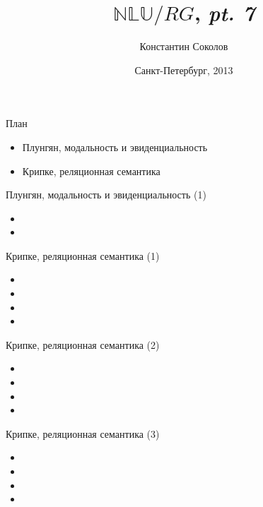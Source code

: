 \documentclass{beamer}
\begin{document}
\title{\huge{$\mathbb{NLU}/RG$, \textit{pt. 7}}}
\author{Константин Соколов}
\date{Санкт-Петербург, 2013} 
\begin{frame}
    \thispagestyle{empty}
    \titlepage
\end{frame}

\begin{frame}{План}
    \setcounter{framenumber}{1}
    \begin{itemize}
        \item Плунгян, модальность и эвиденциальность
        \item Крипке, реляционная семантика
    \end{itemize}
\end{frame}

\begin{frame}{Плунгян, модальность и эвиденциальность (1)}
\begin{itemize}
  \item 
  \item 
\end{itemize}
\end{frame}

\begin{frame}{Крипке, реляционная семантика (1)}
\begin{itemize}
  \item 
  \item 
  \item 
  \item 
\end{itemize}
\end{frame}

\begin{frame}{Крипке, реляционная семантика (2)}
\begin{itemize}
  \item 
  \item 
  \item 
  \item 
\end{itemize}
\end{frame}

\begin{frame}{Крипке, реляционная семантика (3)}
\begin{itemize}
  \item 
  \item 
  \item 
  \item 
\end{itemize}
\end{frame}
\end{document}
